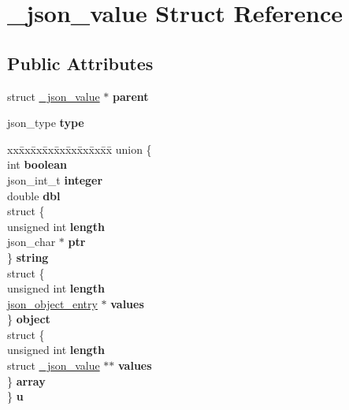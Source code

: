\hypertarget{struct__json__value}{}\section{\+\_\+json\+\_\+value Struct Reference}
\label{struct__json__value}
\subsection*{Public Attributes}
\begin{DoxyCompactItemize}
\item 
\mbox{\label{struct__json__value_ad81b8fbce3bc5814ef79090fa2899ad8}} 
struct \mbox{\hyperlink{struct__json__value}{\+\_\+json\+\_\+value}} $\ast$ {\bfseries parent}
\item 
\mbox{\label{struct__json__value_a3a3106e0e259510de33b4718208be4d3}} 
json\+\_\+type {\bfseries type}
\item 
\mbox{\label{struct__json__value_a484f803406a539c81778854d8a83ae3b}} 
\begin{tabbing}
xx\=xx\=xx\=xx\=xx\=xx\=xx\=xx\=xx\=\kill
union \{\\
\>int {\bfseries boolean}\\
\>json\_int\_t {\bfseries integer}\\
\>double {\bfseries dbl}\\
\>struct \{\\
\>\>unsigned int {\bfseries length}\\
\>\>json\_char $\ast$ {\bfseries ptr}\\
\>\} {\bfseries string}\\
\>struct \{\\
\>\>unsigned int {\bfseries length}\\
\>\>\mbox{\hyperlink{struct__json__object__entry}{json\_object\_entry}} $\ast$ {\bfseries values}\\
\>\} {\bfseries object}\\
\>struct \{\\
\>\>unsigned int {\bfseries length}\\
\>\>struct \mbox{\hyperlink{struct__json__value}{\_json\_value}} $\ast$$\ast$ {\bfseries values}\\
\>\} {\bfseries array}\\
\} {\bfseries u}\\


\end{tabbing}
\end{DoxyCompactItemize}
